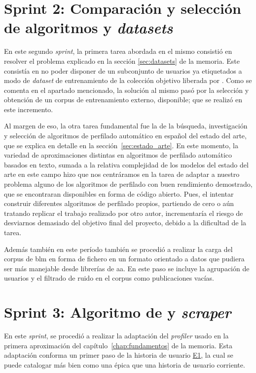 \section{Sprint 2: Comparación y selección de algoritmos y \textit{datasets}}
En este segundo \textit{sprint}, la primera tarea abordada en el mismo consistió en resolver el problema explicado en la sección \ref{sec:datasets} de la memoria. Este consistía en no poder disponer de un subconjunto de usuarios ya etiquetados a modo de \textit{dataset} de entrenamiento de la colección objetivo liberada por \citet{heritage_BLM}. Como se comenta en el apartado mencionado, la solución al mismo pasó por la selección y obtención de un corpus de entrenamiento externo, disponible; que se realizó en este incremento.

Al margen de eso, la otra tarea fundamental fue la de la búsqueda, investigación y selección de algoritmos de perfilado automático en español del estado del arte, que se explica en detalle en la sección~\ref{sec:estado_arte}. En este momento, la variedad de aproximaciones distintas en algoritmos de perfilado automático basados en texto, sumada a la relativa complejidad de los modelos del estado del arte en este campo hizo que nos centráramos en la tarea de adaptar a nuestro problema alguno de los algoritmos de perfilado con buen rendimiento demostrado, que se encontraran disponibles en forma de código abierto. Pues, el intentar construir diferentes algoritmos de perfilado propios, 
partiendo de cero o aún tratando replicar el trabajo realizado por otro autor, incrementaría el riesgo de desviarnos demasiado del objetivo final del proyecto, debido a la dificultad de la tarea.

Además también en este período también se procedió a realizar la carga del corpus de \acrshort{blm} en forma de fichero en un formato orientado a datos que pudiera ser más manejable desde librerías de \acrshort{aa}. En este paso se incluye la agrupación de usuarios y el filtrado de ruido en el corpus como publicaciones vacías.

\section{Sprint 3: Algoritmo de \citet{loscalis22} y \textit{scraper}}

En este \textit{sprint}, se procedió a realizar la adaptación del \textit{profiler} usado en la primera aproximación del capítulo~\ref{chap:fundamentos} de la memoria. Esta adaptación conforma un primer paso de la historia de usuario \hyperref[tab:user-stories]{E1}, la cual se puede catalogar más bien como una épica que una historia de usuario corriente.

